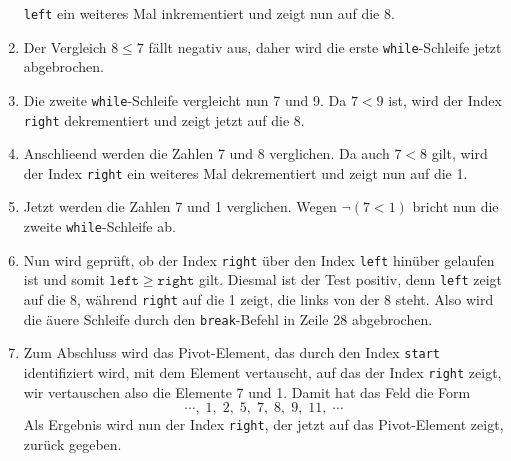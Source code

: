 \begin{enumerate}
      \texttt{left} ein weiteres Mal inkrementiert und zeigt nun auf die 8.
\item Der Vergleich $8 \leq 7$ f\"allt negativ aus, daher wird die erste
      \texttt{while}-Schleife jetzt abgebrochen.
\item Die zweite \texttt{while}-Schleife vergleicht nun 7 und 9.  Da $7 < 9$ ist,
      wird der Index \texttt{right} dekrementiert und zeigt jetzt auf die 8.
\item Anschlie\3end werden die Zahlen 7 und 8 verglichen.  Da auch $7 < 8$ gilt, wird der
      Index \texttt{right} ein weiteres Mal dekrementiert und zeigt nun auf die 1.
\item Jetzt werden die Zahlen 7 und 1 verglichen.  Wegen $\neg (7 < 1)$ bricht nun die
      zweite \texttt{while}-Schleife ab.
\item Nun wird gepr\"uft, ob der Index \texttt{right} \"uber den Index
      \texttt{left} hin\"uber gelaufen ist und somit $\mathtt{left} \geq \mathtt{right}$
      gilt.  Diesmal ist der Test positiv, denn \texttt{left} zeigt auf die 8,
      w\"ahrend \texttt{right} auf die 1 zeigt, die links von der 8 steht.
      Also wird die \"au\3ere Schleife durch den \texttt{break}-Befehl in Zeile 28
      abgebrochen.
\item Zum Abschluss wird das Pivot-Element, das durch den Index \texttt{start}
      identifiziert wird, mit dem Element vertauscht, auf das der Index \texttt{right}
      zeigt,  wir vertauschen also die Elemente 7 und 1.  Damit hat das Feld die Form
      \[ \cdots,\; 1,\; 2,\; 5,\; 7,\; 8,\; 9,\; 11,\;\cdots \]
      Als Ergebnis wird nun der Index \texttt{right}, der jetzt auf das Pivot-Element
      zeigt, zur\"uck gegeben.
\end{enumerate}
 
